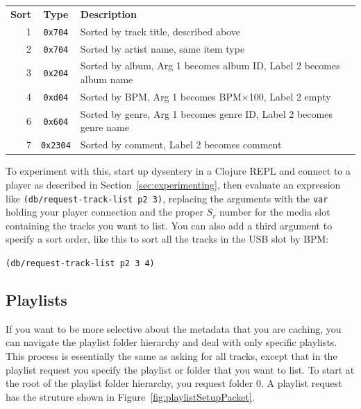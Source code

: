 \documentclass[11pt]{article}
\begin{document}
\begin{center}
  \begin{tabu}{rcX}
    \toprule

    \bfseries{Sort} & \bfseries{Type} & \bfseries{Description} \\

    1 & {\tt 0x704} & Sorted by track title, described above \\

    2 & {\tt 0x704} & Sorted by artist name, same item type \\

    3 & {\tt 0x204} & Sorted by album, Arg 1 becomes album ID, Label 2 becomes album name \\

    4 & {\tt 0xd04} & Sorted by BPM, Arg 1 becomes BPM$\times$100, Label 2 empty \\

    6 & {\tt 0x604} & Sorted by genre, Arg 1 becomes genre ID, Label 2 becomes genre name \\

    7 & {\tt 0x2304} & Sorted by comment, Label 2 becomes comment \\

    \bottomrule
  \end{tabu}
\end{center}

To experiment with this, start up dysentery in a Clojure REPL and
connect to a player as described in Section~\ref{sec:experimenting},
then evaluate an expression like {\tt (db/request-track-list p2 3)},
replacing the arguments with the {\tt var} holding your player
connection and the proper $S_r$ number for the media slot containing
the tracks you want to list. You can also add a third argument to
specify a sort order, like this to sort all the tracks in the USB slot
by BPM:

{\tt (db/request-track-list p2 3 4)}


\subsection{Playlists}

If you want to be more selective about the metadata that you are
caching, you can navigate the playlist folder hierarchy and deal with
only specific playlists. This process is essentially the same as asking
for all tracks, except that in the playlist request you specify the
playlist or folder that you want to list. To start at the root of the
playlist folder hierarchy, you request folder 0. A playlist request
has the struture shown in Figure~\ref{fig:playlistSetupPacket}.
\end{document}
